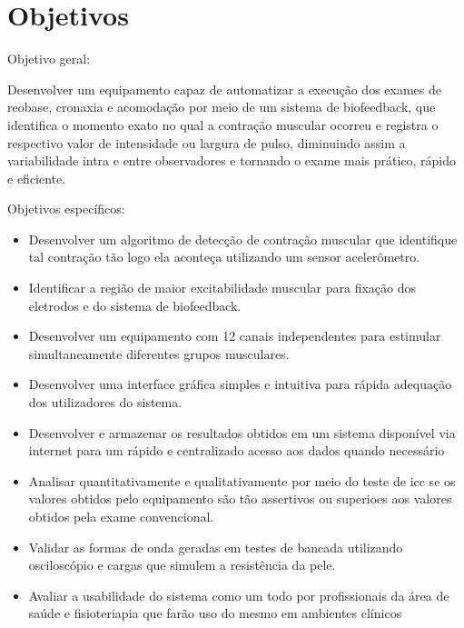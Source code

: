 \section{Objetivos}

Objetivo geral:

Desenvolver um equipamento capaz de automatizar a execução dos exames de reobase, cronaxia e acomodação por meio de um sistema de biofeedback, que identifica o momento exato no qual a contração muscular ocorreu e registra o respectivo valor de intensidade ou largura de pulso, diminuindo assim a variabilidade intra e entre observadores e tornando o exame mais prático, rápido e eficiente.

Objetivos específicos:

\begin{itemize}
    \item Desenvolver um algoritmo de detecção de contração muscular que identifique tal contração tão logo ela aconteça utilizando um sensor acelerômetro.
    \item Identificar a região de maior excitabilidade muscular para fixação dos eletrodos e do sistema de biofeedback.
    \item Desenvolver um equipamento com 12 canais independentes para estimular simultaneamente diferentes grupos musculares.
    \item Desenvolver uma interface gráfica simples e intuitiva para rápida adequação dos utilizadores do sistema.
    \item Desenvolver e armazenar os resultados obtidos em um sistema disponível via internet para um rápido e centralizado acesso aos dados quando necessário
    \item Analisar quantitativamente e qualitativamente por meio do teste de \ac{icc} se os valores obtidos pelo equipamento são tão assertivos ou superioes aos valores obtidos pela exame convencional.
    \item Validar as formas de onda geradas em testes de bancada utilizando osciloscópio e cargas que simulem a resistência da pele.
    \item Avaliar a usabilidade do sistema como um todo por profissionais da área de saúde e fisioteriapia que farão uso do mesmo em ambientes clínicos
\end{itemize}
